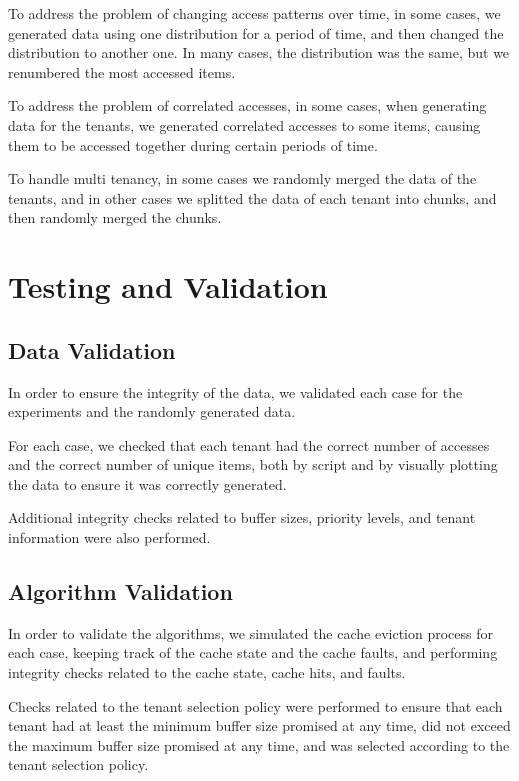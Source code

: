 To address the problem of changing access patterns over time, in some cases, we generated data 
using one distribution for a period of time, and then changed the distribution to another one. 
In many cases, the distribution was the same, but we renumbered the most accessed items.

To address the problem of correlated accesses, in some cases, when generating data for the 
tenants, we generated correlated accesses to some items, causing them to be accessed together 
during certain periods of time.

To handle multi tenancy, in some cases we randomly merged the data of the tenants, and in 
other cases we splitted the data of each tenant into chunks, and then randomly merged the
chunks.

\section{Testing and Validation}

\subsection{Data Validation}

In order to ensure the integrity of the data, we validated each case for the experiments and 
the randomly generated data.

For each case, we checked that each tenant had the correct number of accesses and the correct 
number of unique items, both by script and by visually plotting the data to ensure it was 
correctly generated.

Additional integrity checks related to buffer sizes, priority levels, and tenant information 
were also performed.

\subsection{Algorithm Validation}

In order to validate the algorithms, we simulated the cache eviction process for each case, 
keeping track of the cache state and the cache faults, and performing integrity checks related 
to the cache state, cache hits, and faults.

Checks related to the tenant selection policy were performed to ensure that each tenant had at 
least the minimum buffer size promised at any time, did not exceed the maximum buffer size 
promised at any time, and was selected according to the tenant selection policy.

